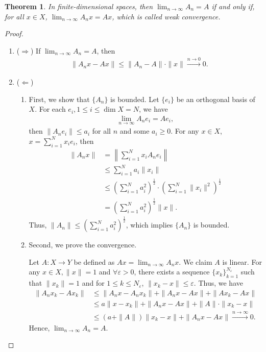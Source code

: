 \documentclass[11pt]{book}
\newtheorem{theorem}{Theorem}[section]
\theoremstyle{definition}
\numberwithin{equation}{subsection}
\begin{document}
\begin{theorem}
In finite-dimensional spaces, then $\lim_{n\to\infty}A_n = A$ if and only if, for all $x\in X$, $\lim_{n\to\infty} A_n x = Ax$, which is called weak convergence.
\end{theorem}
\begin{proof}
~\begin{enumerate}[label=(\arabic*)]
    \item ($\Rightarrow$) If $\lim_{n\to\infty}A_n = A$, then 
    \begin{align*}
        \|A_n x - Ax\| \leq \|A_n - A\|\cdot \|x\| \xrightarrow{n \to 0} 0.
    \end{align*}
    \item ($\Leftarrow$) 
    \begin{enumerate}[label=(\alph*)]
        \item First, we show that $\{A_n\}$ is bounded. Let $\{e_i\}$ be an orthogonal basis of $X$. For each $e_i, 1\leq i\leq \dim X = N$, we have
        \begin{align*}
            \lim_{n\to\infty} A_n e_i = A e_i,
        \end{align*}
        then $\|A_n e_i\| \leq a_i$ for all $n$ and some $a_i \geq 0$. For any $x\in X$, $x = \sum^N_{i=1}x_i e_i$, then
        \begin{align*}
            \|A_n x\| & = \left\|\sum^N_{i=1}x_i A_n e_i\right\| \\
            & \leq \sum^N_{i=1}a_i \|x_i\| \\
            & \leq \left(\sum^N_{i=1}a_i^2\right)^{\frac{1}{2}} \cdot \left(\sum^N_{i=1}\|x_i\|^2\right)^{\frac{1}{2}} \\
            &  = \left(\sum^N_{i=1}a_i^2\right)^{\frac{1}{2}} \|x\|.
        \end{align*}
        Thus, $\|A_n\| \leq \left(\sum^N_{i=1}a_i^2\right)^{\frac{1}{2}}$, which implies $\{A_n\}$ is bounded.
        \item Second, we prove the convergence.
        
        Let $A:X\to Y$ be defined as $Ax = \lim_{n\to\infty}A_n x$. We claim $A$ is linear. For any $x\in X, \|x\| = 1$ and $\forall \varepsilon > 0$, there exists a sequence $\{x_k\}^{N_\varepsilon}_{k=1}$ such that $\|x_k\| = 1$ and for $1\leq k \leq N_\varepsilon$, $\|x_k - x\| \leq \varepsilon$. Thus, we have
        \begin{align*}
            \|A_n x_k  - Ax_k\| & \leq \|A_n x - A_n x_k\| + \|A_n x - A x\| + \|Ax_k - Ax\| \\
            & \leq a\|x - x_k\| + \|A_n x - A x\| + \|A\|\cdot \|x_k - x\| \\
            & \leq (a + \|A\|)\|x_k - x\| + \|A_n x - A x\| \xrightarrow{n\to\infty} 0. 
        \end{align*}
        Hence, $\lim_{n\to\infty}A_n = A$.
    \end{enumerate}
\end{enumerate}
\end{proof}
\end{document}
